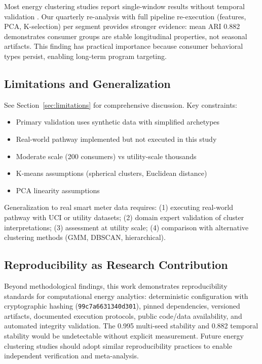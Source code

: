 Most energy clustering studies report single-window results without temporal validation \cite{kwac2014household,rhodes2014clustering}. Our quarterly re-analysis with full pipeline re-execution (features, PCA, K-selection) per segment provides stronger evidence: mean ARI 0.882 demonstrates consumer groups are stable longitudinal properties, not seasonal artifacts. This finding has practical importance because consumer behavioral types persist, enabling long-term program targeting.

\subsection{Limitations and Generalization}

See Section~\ref{sec:limitations} for comprehensive discussion. Key constraints:
\begin{itemize}
    \item Primary validation uses synthetic data with simplified archetypes
    \item Real-world pathway implemented but not executed in this study
    \item Moderate scale (200 consumers) vs utility-scale thousands
    \item K-means assumptions (spherical clusters, Euclidean distance)
    \item PCA linearity assumptions
\end{itemize}

Generalization to real smart meter data requires: (1) executing real-world pathway with UCI or utility datasets; (2) domain expert validation of cluster interpretations; (3) assessment at utility scale; (4) comparison with alternative clustering methods (GMM, DBSCAN, hierarchical).

\subsection{Reproducibility as Research Contribution}

Beyond methodological findings, this work demonstrates reproducibility standards for computational energy analytics: deterministic configuration with cryptographic hashing (\texttt{99c7a6631340d301}), pinned dependencies, versioned artifacts, documented execution protocols, public code/data availability, and automated integrity validation. The 0.995 multi-seed stability and 0.882 temporal stability would be undetectable without explicit measurement. Future energy clustering studies should adopt similar reproducibility practices to enable independent verification and meta-analysis.
